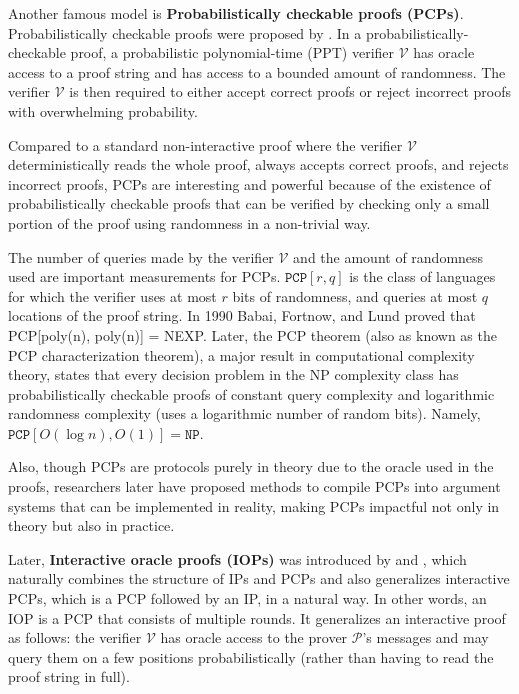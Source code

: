 Another famous model is \textbf{Probabilistically checkable proofs (PCPs)}. Probabilistically checkable proofs were proposed by \cite{DBLP:journals/tcs/FortnowRS94} \cite{DBLP:conf/stoc/BabaiFLS91}. In a probabilistically-checkable proof, a probabilistic polynomial-time (PPT) verifier $\mathcal{V}$ has oracle access to a proof string and has access to a bounded amount of randomness. The verifier $\mathcal{V}$ is then required to either accept correct proofs or reject incorrect proofs with overwhelming probability. 

Compared to a standard non-interactive proof where the verifier $\mathcal{V}$ deterministically reads the whole proof, always accepts correct proofs, and rejects incorrect proofs, 
PCPs are interesting and powerful because of the existence of probabilistically checkable proofs that can be verified by checking only a small portion of the proof using randomness in a non-trivial way.

The number of queries made by the verifier $\mathcal{V}$ and the amount of randomness used are important measurements for PCPs. $\texttt{PCP}[r, q]$ is the class of languages for which the verifier uses at most $r$ bits of randomness, and queries at most $q$ locations of the proof string.
In 1990 Babai, Fortnow, and Lund \cite{DBLP:conf/focs/BabaiFL90} proved that PCP[poly(n), poly(n)] = NEXP. 
Later, the PCP theorem (also as known as the PCP characterization theorem), 
a major result in computational complexity theory, 
states that every decision problem in the NP complexity class has probabilistically checkable proofs of constant query complexity 
and logarithmic randomness complexity (uses a logarithmic number of random bits).
Namely, $\texttt{PCP}[O(\log n), O(1)] = \texttt{NP}$.

Also, though PCPs are protocols purely in theory due to the oracle used in the proofs, researchers later have proposed methods \cite{DBLP:conf/stoc/Kilian92} to compile PCPs into argument systems that can be implemented in reality, making PCPs impactful not only in theory but also in practice. 

Later, \textbf{Interactive oracle proofs (IOPs)} was introduced by \cite{DBLP:conf/tcc/Ben-SassonCS16} and \cite{DBLP:journals/jacm/KalaiRR22}, which naturally combines the structure of IPs and PCPs and also generalizes interactive PCPs, which is a PCP followed by an IP, in a natural way.
In other words, an IOP is a PCP that consists of multiple rounds. It generalizes an interactive proof as follows:
the verifier $\mathcal{V}$ has oracle access to the prover $\mathcal{P}$’s messages and may query them on a few positions probabilistically (rather than having to read the proof string in full). 

